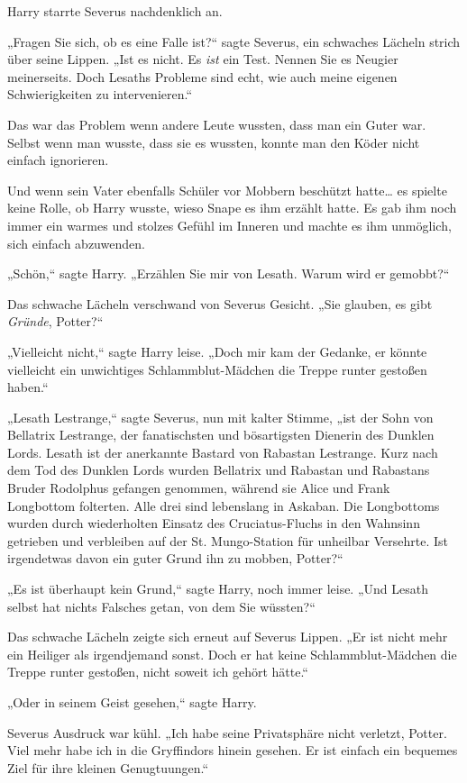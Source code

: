 {Harry starrte Severus nachdenklich an.

„Fragen Sie sich, ob es eine Falle ist?“ sagte Severus, ein schwaches Lächeln strich über seine Lippen. „Ist es nicht. Es \emph{ist} ein Test. Nennen Sie es Neugier meinerseits. Doch Lesaths Probleme sind echt, wie auch meine eigenen Schwierigkeiten zu intervenieren.“

Das war das Problem wenn andere Leute wussten, dass man ein Guter war. Selbst wenn man wusste, dass sie es wussten, konnte man den Köder nicht einfach ignorieren.

Und wenn sein Vater ebenfalls Schüler vor Mobbern beschützt hatte… es spielte keine Rolle, ob Harry wusste, wieso Snape es ihm erzählt hatte. Es gab ihm noch immer ein warmes und stolzes Gefühl im Inneren und machte es ihm unmöglich, sich einfach abzuwenden.

„Schön,“ sagte Harry. „Erzählen Sie mir von Lesath. Warum wird er gemobbt?“

Das schwache Lächeln verschwand von Severus Gesicht. „Sie glauben, es gibt \emph{Gründe}, Potter?“

„Vielleicht nicht,“ sagte Harry leise. „Doch mir kam der Gedanke, er könnte vielleicht ein unwichtiges Schlammblut-Mädchen die Treppe runter gestoßen haben.“

„Lesath Lestrange,“ sagte Severus, nun mit kalter Stimme, „ist der Sohn von Bellatrix Lestrange, der fanatischsten und bösartigsten Dienerin des Dunklen Lords. Lesath ist der anerkannte Bastard von Rabastan Lestrange. Kurz nach dem Tod des Dunklen Lords wurden Bellatrix und Rabastan und Rabastans Bruder Rodolphus gefangen genommen, während sie Alice und Frank Longbottom folterten. Alle drei sind lebenslang in Askaban. Die Longbottoms wurden durch wiederholten Einsatz des Cruciatus-Fluchs in den Wahnsinn getrieben und verbleiben auf der St. Mungo-Station für unheilbar Versehrte. Ist irgendetwas davon ein guter Grund ihn zu mobben, Potter?“

„Es ist überhaupt kein Grund,“ sagte Harry, noch immer leise. „Und Lesath selbst hat nichts Falsches getan, von dem Sie wüssten?“

Das schwache Lächeln zeigte sich erneut auf Severus Lippen. „Er ist nicht mehr ein Heiliger als irgendjemand sonst. Doch er hat keine Schlammblut-Mädchen die Treppe runter gestoßen, nicht soweit ich gehört hätte.“

„Oder in seinem Geist gesehen,“ sagte Harry.

Severus Ausdruck war kühl. „Ich habe seine Privatsphäre nicht verletzt, Potter. Viel mehr habe ich in die Gryffindors hinein gesehen. Er ist einfach ein bequemes Ziel für ihre kleinen Genugtuungen.“

}
